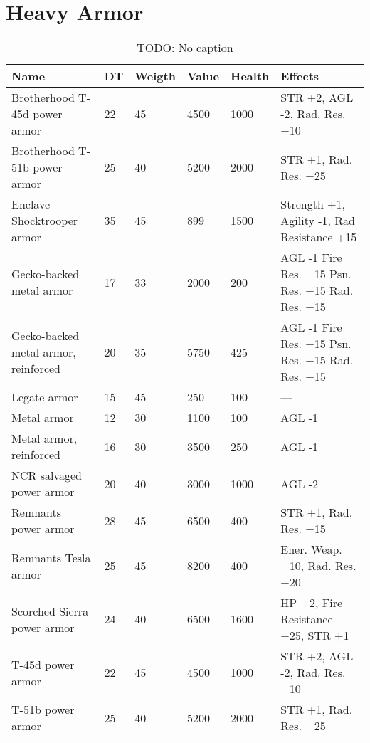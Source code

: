 \documentclass{report}
\begin{document}
\begin{table}[H]
\begin{table}[H]
\begin{table}[H]
\begin{table}[H]
\begin{table}[H]
\begin{table}[H]
\begin{table}[H]
\begin{table}[H]
\begin{table}[H]
\begin{table}[H]
\begin{table}[H]
\begin{table}[H]
\begin{table}[H]
\begin{table}[H]
\begin{table}[H]
\begin{table}[H]
\begin{table}[H]
\begin{table}[H]
\begin{table}[H]
\begin{table}[H]
\chapter{Heavy Armor}
\begin{table}[H]
  \centering
  \begin{tabular}{p{30mm}p{30mm}p{30mm}p{30mm}p{30mm}p{30mm}}
\bfseries Name & \bfseries DT & \bfseries Weigth & \bfseries Value & \bfseries Health & \bfseries Effects \\
\hline
Brotherhood T-45d power armor  & 22 & 45 & 4500 & 1000 & STR +2, AGL -2, Rad. Res. +10  \\
Brotherhood T-51b power armor  & 25 & 40 & 5200 & 2000 & STR +1, Rad. Res. +25  \\
Enclave Shocktrooper armor  & 35 & 45 & 899 & 1500 & Strength +1, Agility -1, Rad Resistance +15  \\
Gecko-backed metal armor  & 17 & 33 & 2000 & 200 & AGL -1 Fire Res. +15 Psn. Res. +15 Rad. Res. +15  \\
Gecko-backed metal armor, reinforced  & 20 & 35 & 5750 & 425 & AGL -1 Fire Res. +15 Psn. Res. +15 Rad. Res. +15  \\
Legate armor  & 15 & 45 & 250 & 100 & —  \\
Metal armor  & 12 & 30 & 1100 & 100 & AGL -1  \\
Metal armor, reinforced  & 16 & 30 & 3500 & 250 & AGL -1  \\
NCR salvaged power armor  & 20 & 40 & 3000 & 1000 & AGL -2  \\
Remnants power armor  & 28 & 45 & 6500 & 400 & STR +1, Rad. Res. +15  \\
Remnants Tesla armor  & 25 & 45 & 8200 & 400 & Ener. Weap. +10, Rad. Res. +20  \\
Scorched Sierra power armor  & 24 & 40 & 6500 & 1600 & HP +2, Fire Resistance +25, STR +1  \\
T-45d power armor  & 22 & 45 & 4500 & 1000 & STR +2, AGL -2, Rad. Res. +10  \\
T-51b power armor  & 25 & 40 & 5200 & 2000 & STR +1, Rad. Res. +25  \\
  \end{tabular}
  \caption{TODO: No caption}
  \label{tab:4}
\end{table}

\end{table}
\end{table}
\end{table}
\end{table}
\end{table}
\end{table}
\end{table}
\end{table}
\end{table}
\end{table}
\end{table}
\end{table}
\end{table}
\end{table}
\end{table}
\end{table}
\end{table}
\end{table}
\end{table}
\end{table}
\end{document}
